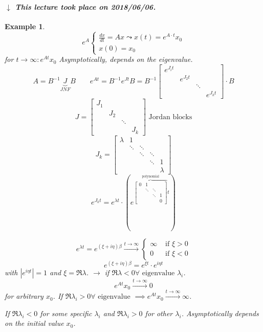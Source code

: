 \documentclass{article}
\newtheorem{example}{Example}  \numberwithin{example}{section}
\newcommand{\card}[1]{\left|#1\right|}
\newcommand{\dateref}[1]{%
  \begin{mdframed}[backgroundcolor=gray!10,innerbottommargin=0pt,innertopmargin=0pt]
    \paragraph{\textit{$\downarrow$ This lecture took place on #1.}}%
  \end{mdframed}%
}
\begin{document}
\dateref{2018/06/06}

\begin{example} %
  \[ e^A \begin{cases} \frac{dx}{dt} = Ax \leadsto x(t) = e^{A \cdot t} x_0 \\ x(0) = x_0 \end{cases} \]
  for $t \to \infty: e^{At} x_0$
  Asymptotically, depends on the eigenvalue.
  \[ A = B^{-1} \underbrace{J}_{JNF} B \qquad e^{At} = B^{-1} e^{Jt} B = B^{-1} \begin{bmatrix} e^{J_it} & & & \\ & e^{J_2 t} & & \\ & & \ddots & \\ & & & e^{J_k t} \end{bmatrix} \cdot B \]
  \[ J = \begin{bmatrix} J_1 & & & \\ & J_2 & & \\ & & \ddots & \\ & & & J_k \end{bmatrix} \text{ Jordan blocks} \]
  \[ J_k = \begin{bmatrix} \lambda & 1 & & & \\ & \ddots & \ddots & & \\ & & \ddots & \ddots & \\ & & & \ddots & 1 \\ & & & & \lambda \end{bmatrix} \]
  \[ e^{J_k t} = e^{\lambda t} \cdot \left(e^{\overbrace{\begin{bmatrix} 0 & 1 & & \\ & \ddots & \ddots & \\ & & \ddots & 1 \\ & & & 0 \end{bmatrix}}^{\text{polynomial}} t}\right) \]

  \[ e^{\lambda t} = e^{(\xi + i \eta) \beta} \xrightarrow{t \to \infty} \begin{cases} \infty & \text{ if } \xi > 0 \\ 0 & \text{ if } \xi < 0 \end{cases} \]
  \[ e^{(\xi + i \eta) \beta} = e^{\xi t} \cdot e^{i \eta t} \]
  with $\card{e^{i \eta t}} = 1$ and $\xi = \Re{\lambda}$.
  $\to$ if $\Re{\lambda} < 0 \forall \text{ eigenvalue } \lambda_i$.
  \[ e^{At} x_0 \xrightarrow{t \to \infty} 0 \]
  for arbitrary $x_0$.
  If $\Re{\lambda_i} > 0 \forall \text{ eigenvalue}$ $\implies e^{At} x_0 \xrightarrow{t \to \infty} \infty$.

  If $\Re{\lambda_i} < 0$ for some specific $\lambda_i$ and $\Re{\lambda_i} > 0$ for other $\lambda_i$.
  Asymptotically depends on the initial value $x_0$.
\end{example}
\end{document}
